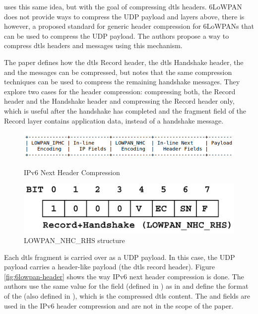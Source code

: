 \documentclass{llncs}
\begin{document}
\cite{6LoWPANC53:online} uses this same idea, but with the goal of compressing \gls{dtls} headers.
6LoWPAN does not provide ways to compress the UDP payload and layers above, there
is however, a proposed standard\cite{RFC7400} for generic header compression
for 6LoWPANs that can be used to compress the UDP payload. The authors propose
a way to compress \gls{dtls} headers and messages using this mechanism.

The paper \cite{6LoWPANC53:online} defines how the \gls{dtls} Record header, the \gls{dtls} Handshake header,
the  and the  messages can be compressed, but notes that
the same compression techniques can be used to compress the remaining handshake
messages. They explore two cases for the header compression: compressing both,
the Record header and the Handshake header and compressing the Record header only,
which is useful after the handshake has completed and the fragment field of the
Record layer contains application data, instead of a handshake message.

\begin{figure}
    \centering
    \begin{minipage}{0.5\textwidth}
        \centering
        \includegraphics[width=1.0\textwidth]{img/6lowpan-header.png} %
        \caption{\label{fig:6lowpan-header} IPv6 Next Header Compression}
    \end{minipage}\hfill
    \begin{minipage}{0.5\textwidth}
        \centering
        \includegraphics[width=1.0\textwidth]{img/6lowpan-ghc-rhs.png} %
        \caption{\label{fig:6lowpan-ghc-rhs} LOWPAN\_NHC\_RHS structure}
    \end{minipage}
\end{figure}


Each \gls{dtls} fragment is carried over as a UDP payload. In this case,
the UDP payload carries a header-like payload (the \gls{dtls} record header).
Figure \ref{fig:6lowpan-header} shows the way IPv6 next header compression is done.
The authors use the same value for the  field (defined in \cite{RFC6282})
as in  and define the format of the 
(also defined in \cite{RFC6282}), which is the compressed \gls{dtls} content. The 
and  fields are used in the IPv6 header compression
and are not in the scope of the paper.
\end{document}
